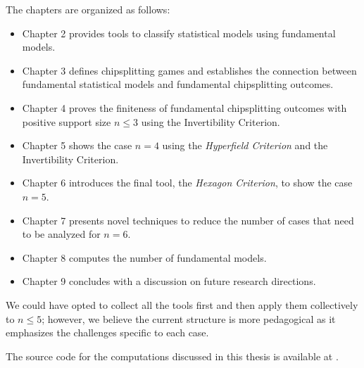 The chapters are organized as follows:
\begin{itemize}
    \item Chapter 2 provides tools to classify statistical models using fundamental models.
    \item Chapter 3 defines chipsplitting games and establishes the connection between fundamental statistical models and fundamental chipsplitting outcomes.
    \item Chapter 4 proves the finiteness of fundamental chipsplitting outcomes with positive support size \( n \leq 3 \) using the Invertibility Criterion.
    \item Chapter 5 shows the case \( n = 4 \) using the \emph{Hyperfield Criterion} and the Invertibility Criterion.
    \item Chapter 6 introduces the final tool, the \emph{Hexagon Criterion}, to show the case \( n = 5 \).
    \item Chapter 7 presents novel techniques to reduce the number of cases that need to be analyzed for \( n = 6 \).
    \item Chapter 8 computes the number of fundamental models.
    \item Chapter 9 concludes with a discussion on future research directions.
\end{itemize}


We could have opted to collect all the tools first and then apply them collectively to \( n \leq 5 \); however, we believe the current structure is more pedagogical as it emphasizes the challenges specific to each case.

The source code for the computations discussed in this thesis is available at \cite{ducrepo}.